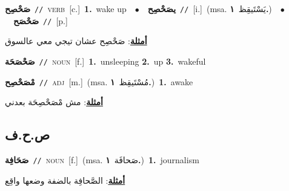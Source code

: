 \documentclass[10pt,a4paper,twoside]{article} %
\begin{document}
\begin{multicols}{2}
{{{{{{{{{{\setlength\topsep{0pt}\textbf{\foreignlanguage{arabic}{صَحْصِح}}\ {\color{gray}\texttt{//}\color{black}}\ \textsc{verb}\ [c.]\ \textbf{1.}~wake up\ \ $\bullet$\ \ \setlength\topsep{0pt}\textbf{\foreignlanguage{arabic}{يصَحْصِح}}\ {\color{gray}\texttt{//}\color{black}}\ [i.]\ \color{gray}(msa. \foreignlanguage{arabic}{يَسْتَيقِظ}~\foreignlanguage{arabic}{\textbf{١.}})\color{black}\ \ $\bullet$\ \ \setlength\topsep{0pt}\textbf{\foreignlanguage{arabic}{صَحْصَح}}\ {\color{gray}\texttt{//}\color{black}}\ [p.]\  \begin{flushright}\color{gray}\foreignlanguage{arabic}{\textbf{\underline{\foreignlanguage{arabic}{أمثلة}}}: صَحْصِح عشان تيجي معي عالسوق}\end{flushright}\color{black}} \vspace{2mm}

{\setlength\topsep{0pt}\textbf{\foreignlanguage{arabic}{صَحْصَحَة}}\ {\color{gray}\texttt{//}\color{black}}\ \textsc{noun}\ [f.]\ \textbf{1.}~unsleeping  \textbf{2.}~up  \textbf{3.}~wakeful\ 

{\setlength\topsep{0pt}\textbf{\foreignlanguage{arabic}{مْصَحْصِح}}\ {\color{gray}\texttt{//}\color{black}}\ \textsc{adj}\ [m.]\ \color{gray}(msa. \foreignlanguage{arabic}{مُسْتَيقِظ}~\foreignlanguage{arabic}{\textbf{١.}})\color{black}\ \textbf{1.}~awake\  \begin{flushright}\color{gray}\foreignlanguage{arabic}{\textbf{\underline{\foreignlanguage{arabic}{أمثلة}}}: مش مْصَحْصِحَة بعدني}\end{flushright}\color{black}} \vspace{2mm}

\vspace{-3mm}
\subsection*{\color{blue}\foreignlanguage{arabic}{ص.ح.ف}\color{blue}{}} 

{\setlength\topsep{0pt}\textbf{\foreignlanguage{arabic}{صَحَافِة}}\ {\color{gray}\texttt{//}\color{black}}\ \textsc{noun}\ [f.]\ \color{gray}(msa. \foreignlanguage{arabic}{صَحافَة}~\foreignlanguage{arabic}{\textbf{١.}})\color{black}\ \textbf{1.}~journalism\  \begin{flushright}\color{gray}\foreignlanguage{arabic}{\textbf{\underline{\foreignlanguage{arabic}{أمثلة}}}: الصَّحافِة بالضفة وضعها واقِع}\end{flushright}\color{black}} \vspace{2mm}

}}}}}}}}}}
\end{multicols}
\end{document}
